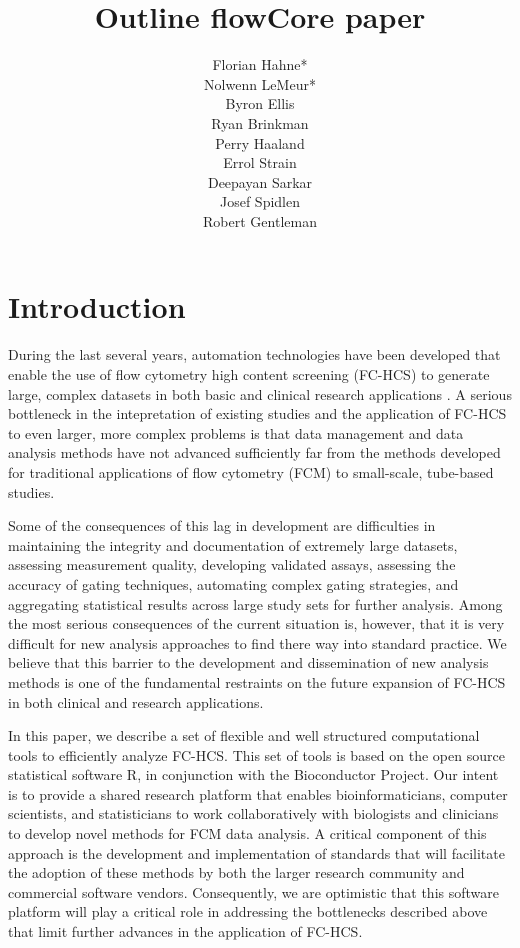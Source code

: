 \documentclass[12pt]{article}
\title{Outline flowCore paper}
\author{Florian Hahne*\\
  Nolwenn LeMeur*\\
  Byron Ellis\\
  Ryan Brinkman\\
  Perry Haaland\\
  Errol Strain\\
  Deepayan Sarkar\\
  Josef Spidlen\\
  Robert Gentleman
 }
\begin{document}
\maketitle

\section*{Introduction}
During the last several years, automation technologies have been developed
that enable the use of flow cytometry high content screening (FC-HCS)
to generate large, complex datasets in both basic and clinical research
applications \citep{brinkman2007hcf}. A
serious bottleneck in the intepretation of existing studies and the application of
FC-HCS to even larger, more complex problems is that data management
and data analysis methods have not advanced sufficiently far from the
methods developed for 
traditional applications of flow cytometry (FCM) to small-scale, tube-based
studies. 

Some of the consequences of this lag in development are difficulties in 
maintaining the integrity and documentation of extremely large datasets,
assessing measurement quality, developing validated assays, assessing the
accuracy of gating techniques, automating complex gating strategies, and
aggregating statistical results across large study sets for further analysis.
Among the most serious consequences of the current situation is, however, 
that it is very difficult for new analysis
approaches to find there way into standard practice. We believe that
this barrier to the development and dissemination of new analysis methods
is one of the fundamental restraints on the
future expansion of FC-HCS in both clinical and research applications.

In this paper, we describe a set of flexible and well
structured computational tools to efficiently analyze
FC-HCS. This set of tools is based on the open source statistical
software R, in conjunction with the Bioconductor Project. Our intent
is to provide a shared research platform that enables
bioinformaticians, computer scientists, and statisticians to work
collaboratively with biologists and clinicians to develop novel methods \citep{lizard2007fca} for FCM
data analysis. A critical component of this approach is the development and implementation
of standards that will facilitate the adoption of these methods
by both the larger research community and commercial software vendors.
Consequently, we are optimistic that this software platform will play a
critical role in addressing the bottlenecks described above that limit
further advances in the application of FC-HCS.
\end{document}
